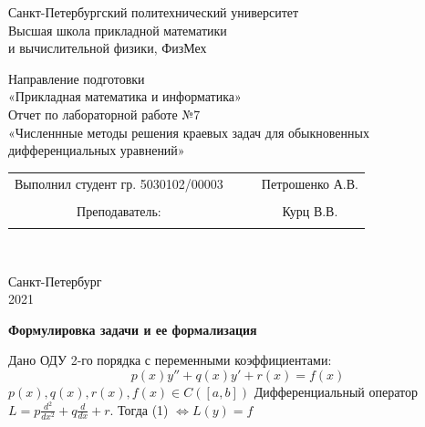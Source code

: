 \documentclass{article}
\begin{document}
	\begin{center}
		\hfill \break
		\begin{center}
			\huge{Санкт-Петербургский политехнический университет\\
				Высшая школа прикладной математики\\
				и вычислительной физики, ФизМех} 
		\end{center}
		\hfill \break
		\hfill \break
		\hfill \break
		\hfill \break
		\hfill \break
		\huge{Направление подготовки\\
			«Прикладная математика и информатика»}\\
		\hfill \break
		\hfill \break
		\hfill \break
		\hfill \break
		\hfill \break
		\hfill \break
		\fontsize{14pt}{14pt}\selectfont
		Отчет по лабораторной работе №7\\
		«Численнные методы решения краевых задач для обыкновенных дифференциальных уравнений»\\
		\hfill \break
		\hfill \break
		\hfill \break
		\hfill \break
		\hfill \break
	\end{center}
	\hfill \break
	\hfill \break
	\fontsize{12pt}{12pt}\selectfont
	\begin{tabular}{cccc}
		\hspace{1cm}Выполнил студент гр. 5030102/00003 & {\hspace{3cm}} & & Петрошенко А.В. \\\\
		\hspace{-3cm}Преподаватель: &{\hspace{1cm}}& & {\hspace{1cm}} Курц В.В. \\\\
	\end{tabular}\\
	\hfill \break
	\hfill \break
	\hfill \break
	\hfill \break
	\hfill \break
	\hfill \break
	\begin{center} Санкт-Петербург\\ 
		2021\\
	\end{center}
	\thispagestyle{empty}
	\newpage
	\begin{center} \textbf{Формулировка задачи и ее формализация}\end{center}
	Дано ОДУ 2-го порядка с переменными коэффициентами:
	\begin{equation}
		p(x)y'' + q(x)y' + r(x) = f(x)
	\end{equation}
	$p(x), q(x), r(x), f(x) \in C([a,b])$
	Дифференциальный оператор $\displaystyle L = p\frac{d^2}{dx^2} + q\frac{d}{dx} + r$. Тогда (1) $\Leftrightarrow L(y) = f$\\
\end{document}
